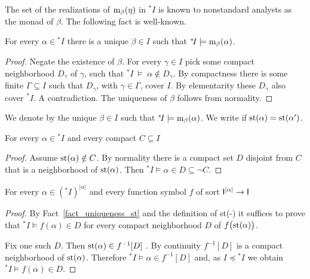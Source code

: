 \documentclass[10pt,oneside]{amsproc}
\renewcommand*{\emph}[1]{%
   \smash{\tikz[baseline]\node[rectangle, fill=teal!25, rounded corners, inner xsep=0.5ex, inner ysep=0.2ex, anchor=base, minimum height = 2.7ex]{\strut #1};}}
\begin{document}
The set of the realizations of ${\rm m}_\beta(\eta)$ in ${}^*\!I$ is known to nonstandard analysts as the monad of $\beta$. 
The following fact is well-known.

\begin{fact}\label{fact_uniqueness_st}
  For every $\alpha\in{}^*\!I$ there is a unique $\beta\in I$ such that ${}^*\!I\models{\rm m}_\beta(\alpha)$.
\end{fact}

\begin{proof}
  Negate the existence of $\beta$.
  For every $\gamma\in I$ pick some compact neighborhood $D_\gamma$ of $\gamma$, such that ${}^*\!I\ \models\ \alpha\notin D_\gamma$.
  By compactness there is some finite $\Gamma\subseteq I$ such that $D_\gamma$, with $\gamma\in\Gamma$, cover $I$.
  By elementarity these $D_{\gamma}$ also cover ${}^*\!I$.
  A contradiction.
  The uniqueness of $\beta$ follows from normality.
\end{proof}

We denote by \emph{${\rm st}(\alpha)$\/} the unique $\beta\in I$ such that ${}^*\!I\models{\rm m}_\beta(\alpha)$.
We write \emph{$\alpha\approx\alpha'$\/} if ${\rm st}(\alpha)={\rm st}(\alpha')$.

\begin{fact}\label{fact_st1}
  For every $\alpha\in{}^*\! I$ and every compact $C\subseteq I$

\end{fact}

\begin{proof}
  Assume ${\rm st}(\alpha)\notin C$.
  By normality there is a compact set $D$ disjoint from $C$ that is a neighborhood of ${\rm st}(\alpha)$.
  Then  ${}^*\!I\models\alpha\in D\subseteq\neg C$.
\end{proof}

\begin{fact}\label{fact_terms_st}
  For every $\alpha\in({}^*\! I)^{|\alpha|}$ and every function symbol $f$ of sort ${\sf I}^{|\alpha|}\to{\sf I}$

\end{fact}

\begin{proof}
  By Fact~\ref{fact_uniqueness_st} and the definition of st(-) it suffices to prove that ${}^*\!I\models f(\alpha)\in D$ for every compact neighborhood $D$ of $f\big({\rm st}(\alpha)\big)$.
  
  Fix one such $D$.
  Then ${\rm st}(\alpha)\in f^{-1}[D]$ .
  By continuity $f^{-1}[D]$ is a compact neighborhood of ${\rm st}(\alpha)$.
  Therefore ${}^*\!I\models \alpha\in f^{-1}[D]$ and, as $I\preceq{}^*\!I$ we obtain ${}^*\!I\models f(\alpha)\in D$.
\end{proof}
\end{document}
